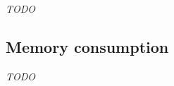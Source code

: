 \documentclass[twoside,11pt,a4paper]{article}
\begin{document}
\textit{TODO}

\subsection{Memory consumption}

\textit{TODO}


%
%
%
%
\end{document}
